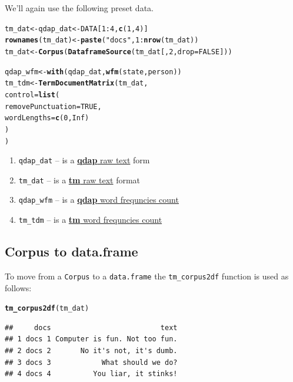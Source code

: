 \documentclass{article}\usepackage[]{graphicx}\usepackage[]{color}
\makeatletter
\newcommand{\hlnum}[1]{\textcolor[rgb]{0.686,0.059,0.569}{#1}}%
\newcommand{\hlstr}[1]{\textcolor[rgb]{0.192,0.494,0.8}{#1}}%
\newcommand{\hlopt}[1]{\textcolor[rgb]{0,0,0}{#1}}%
\newcommand{\hlstd}[1]{\textcolor[rgb]{0.345,0.345,0.345}{#1}}%
\newcommand{\hlkwb}[1]{\textcolor[rgb]{0.69,0.353,0.396}{#1}}%
\newcommand{\hlkwc}[1]{\textcolor[rgb]{0.333,0.667,0.333}{#1}}%
\newcommand{\hlkwd}[1]{\textcolor[rgb]{0.737,0.353,0.396}{\textbf{#1}}}%
\newenvironment{kframe}{%
 \def\at@end@of@kframe{}%
 \ifinner\ifhmode%
  \def\at@end@of@kframe{\end{minipage}}%
  \begin{minipage}{\columnwidth}%
 \fi\fi%
 \def\FrameCommand##1{\hskip\@totalleftmargin \hskip-\fboxsep
 \colorbox{shadecolor}{##1}\hskip-\fboxsep
     \hskip-\linewidth \hskip-\@totalleftmargin \hskip\columnwidth}%
 \MakeFramed {\advance\hsize-\width
   \@totalleftmargin\z@ \linewidth\hsize
   \@setminipage}}%
 {\par\unskip\endMakeFramed%
 \at@end@of@kframe}
\newenvironment{knitrout}{}{} %
\makeatother
\begin{document}
We'll again use the following preset data.

\begin{knitrout}
\color{fgcolor}\begin{kframe}
\begin{alltt}
\hlstd{tm_dat} \hlkwb{<-} \hlstd{qdap_dat} \hlkwb{<-} \hlstd{DATA[}\hlnum{1}\hlopt{:}\hlnum{4}\hlstd{,} \hlkwd{c} \hlstd{(}\hlnum{1}\hlstd{,} \hlnum{4}\hlstd{) ]}
\hlkwd{rownames} \hlstd{(tm_dat)} \hlkwb{<-} \hlkwd{paste} \hlstd{(}\hlstr{"docs"}\hlstd{,} \hlnum{1}\hlopt{:} \hlkwd{nrow} \hlstd{(tm_dat))}
\hlstd{tm_dat} \hlkwb{<-} \hlkwd{Corpus} \hlstd{(} \hlkwd{DataframeSource} \hlstd{(tm_dat[,} \hlnum{2}\hlstd{,} \hlkwc{drop}\hlstd{=}\hlnum{FALSE}\hlstd{]))}

\hlstd{qdap_wfm} \hlkwb{<-} \hlkwd{with} \hlstd{(qdap_dat,} \hlkwd{wfm} \hlstd{(state, person))}
\hlstd{tm_tdm} \hlkwb{<-} \hlkwd{TermDocumentMatrix} \hlstd{(tm_dat,}
    \hlkwc{control} \hlstd{=} \hlkwd{list} \hlstd{(}
        \hlkwc{removePunctuation} \hlstd{=} \hlnum{TRUE}\hlstd{,}
        \hlkwc{wordLengths}\hlstd{=} \hlkwd{c} \hlstd{(}\hlnum{0}\hlstd{,} \hlnum{Inf}\hlstd{)}
    \hlstd{)}
\hlstd{)}
\end{alltt}
\end{kframe}
\end{knitrout}


\begin{enumerate}
  \item \texttt{qdap\_dat} -- is a \underline{\textbf{qdap} raw text} form
  \item \texttt{tm\_dat} -- is a \underline{\textbf{tm} raw text} format
  \item \texttt{qdap\_wfm} -- is a \underline{\textbf{qdap} word frequncies count}
  \item \texttt{tm\_tdm} -- is a \underline{\textbf{tm} word frequncies count}
\end{enumerate}




\subsection{Corpus to data.frame}

To move from a \texttt{Corpus} to a \texttt{data.frame} the \texttt{tm\_corpus2df} function is used as follows:

\begin{knitrout}
\color{fgcolor}\begin{kframe}
\begin{alltt}
\hlkwd{tm_corpus2df}\hlstd{(tm_dat)}
\end{alltt}
\begin{verbatim}
##     docs                          text
## 1 docs 1 Computer is fun. Not too fun.
## 2 docs 2       No it's not, it's dumb.
## 3 docs 3            What should we do?
## 4 docs 4          You liar, it stinks!
\end{verbatim}
\end{kframe}
\end{knitrout}
\end{document}

